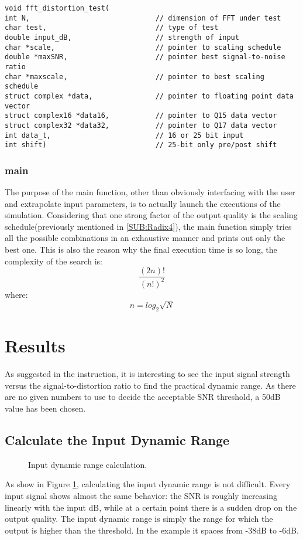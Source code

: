 \documentclass[a4paper]{article}
\begin{document}
\begin{lstlisting}
void fft_distortion_test(
int N,                              // dimension of FFT under test 
char test,                          // type of test
double input_dB,                    // strength of input
char *scale,                        // pointer to scaling schedule
double *maxSNR,                     // pointer best signal-to-noise ratio
char *maxscale,                     // pointer to best scaling schedule
struct complex *data,               // pointer to floating point data vector
struct complex16 *data16,           // pointer to Q15 data vector
struct complex32 *data32,           // pointer to Q17 data vector
int data_t,                         // 16 or 25 bit input
int shift)                          // 25-bit only pre/post shift

\end{lstlisting}

\subsubsection{main}
The purpose of the main function, other than obviously interfacing with the user and extrapolate input parameters, is to actually launch the executions of the simulation.
Considering that one strong factor of the output quality is the scaling schedule(previously mentioned in \ref{SUB:Radix4}), the main function simply tries all the possible combinations in an exhaustive manner and prints out only the best one. This is also the reason why the final execution time is so long, the complexity of the search is: $$\frac{(2n)!}{(n!)^2}$$
where:
$$n = log_2{\sqrt{N}}$$
\pagebreak
\section{Results}
As suggested in the instruction, it is interesting to see the input signal strength versus the signal-to-distortion ratio to find the practical dynamic range.
As there are no given numbers to use to decide the acceptable SNR threshold, a 50dB value has been chosen.

\subsection{Calculate the Input Dynamic Range}
\begin{figure}
	\centering
	\resizebox{1.0\textwidth}{!}{}
	\caption{Input dynamic range calculation.}
	\label{Fig:DYN}
\end{figure}
As show in Figure \ref{Fig:DYN}, calculating the input dynamic range is not difficult. Every input signal shows almost the same behavior: the SNR is roughly increasing linearly with the input dB, while at a certain point there is a sudden drop on the output quality. The input dynamic range is simply the range for which the output is higher than the threshold. In the example it spaces from -38dB to -6dB.
\end{document}
